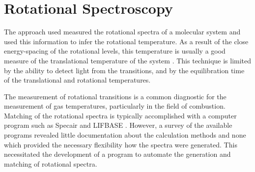\section{Rotational Spectroscopy}

The approach used measured the rotational spectra of
a molecular system and used this information to infer the rotational
temperature. As a result of the close energy-spacing of the rotational levels,
this temperature is usually a good measure of the translational temperature of
the system \cite{Laux1993}. This technique is limited by the ability to detect
light from the transitions, and by the equilibration time of the translational
and rotational temperatures.

The measurement of rotational transitions is a common diagnostic for the
measurement of gas temperatures, particularly in the field of combustion.
Matching of the rotational spectra is typically accomplished with a computer
program such as Specair \cite{Laux2002} and LIFBASE \cite{Luque1999}. However, a
survey of the available programs revealed little documentation about the
calculation methods and none which provided the necessary flexibility how the
spectra were generated. This necessitated the development of a program to
automate the generation and matching of rotational spectra.
